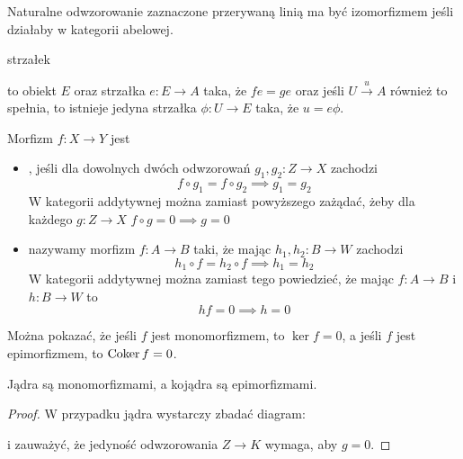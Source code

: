 \begin{definition}
\begin{itemize}
    \begin{center}\end{center}
    Naturalne odwzorowanie zaznaczone przerywaną linią ma być izomorfizmem jeśli działaby w kategorii abelowej.
\end{itemize}
\end{definition}

 strzałek  to obiekt $E$ oraz strzałka $e:E\to A$ taka, że $fe=ge$ oraz jeśli $U\xrightarrow{u}A$ również to spełnia, to istnieje jedyna strzałka $\phi:U\to E$ taka, że $u=e\phi$.


\begin{definition}
  Morfizm $f:X\to Y$ jest
  \begin{itemize}
    \item {}, jeśli dla dowolnych dwóch odwzorowań $g_1,g_2:Z\to X$ zachodzi
      $$f\circ g_1=f\circ g_2\implies g_1=g_2$$
      W kategorii addytywnej można zamiast powyższego zażądać, żeby dla każdego $g:Z\to X$ $f\circ g=0\implies g=0$
    \item {} nazywamy morfizm $f:A\to B$ taki, że mając $h_1,h_2:B\to W$ zachodzi
      $$h_1\circ f=h_2\circ f\implies h_1=h_2$$
      W kategorii addytywnej można zamiast tego powiedzieć, że mając $f:A\to B$ i $h:B\to W$ to
      $$hf=0\implies h=0$$
  \end{itemize}
\end{definition}

Można pokazać, że jeśli $f$ jest monomorfizmem, to $\ker f=0$, a jeśli $f$ jest epimorfizmem, to $\operatorname{Coker} f=0$.

\begin{lemma}
  Jądra są monomorfizmami, a kojądra są epimorfizmami.
\end{lemma}

\begin{proof}
  W przypadku jądra wystarczy zbadać diagram:
  \begin{center}\end{center}
  i zauważyć, że jedyność odwzorowania $Z\to K$ wymaga, aby $g=0$.
\end{proof}

